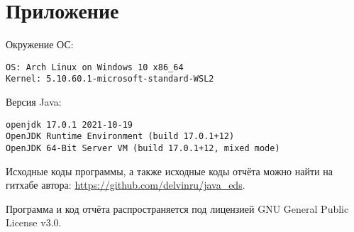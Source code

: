 \section{Приложение}

Окружение ОС:
\begin{verbatim}
OS: Arch Linux on Windows 10 x86_64
Kernel: 5.10.60.1-microsoft-standard-WSL2
\end{verbatim}

Версия Java:
\begin{verbatim}
openjdk 17.0.1 2021-10-19
OpenJDK Runtime Environment (build 17.0.1+12)
OpenJDK 64-Bit Server VM (build 17.0.1+12, mixed mode)
\end{verbatim}

Исходные коды программы, а также исходные коды отчёта можно найти на гитхабе автора: \url{https://github.com/delvinru/java_eds}.

Программа и код отчёта распространяется под лицензией GNU General Public License v3.0.